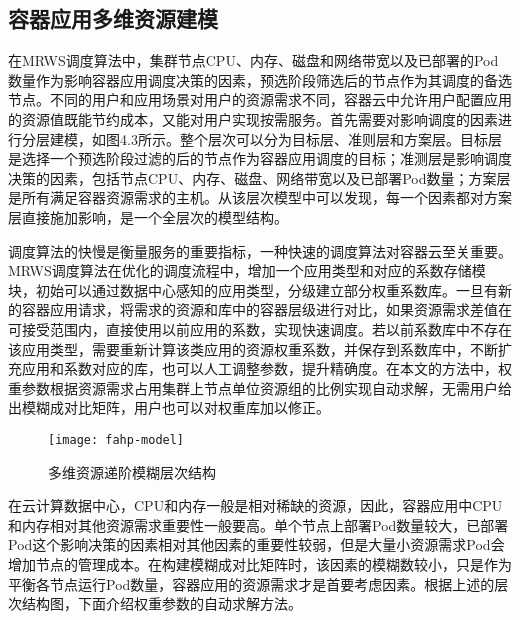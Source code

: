 \subsection{容器应用多维资源建模}
在MRWS调度算法中，集群节点CPU、内存、磁盘和网络带宽以及已部署的Pod数量作为影响容器应用调度决策的因素，预选阶段筛选后的节点作为其调度的备选节点。不同的用户和应用场景对用户的资源需求不同，容器云中允许用户配置应用的资源值既能节约成本，又能对用户实现按需服务。首先需要对影响调度的因素进行分层建模，如图4.3所示。整个层次可以分为目标层、准则层和方案层。目标层是选择一个预选阶段过滤的后的节点作为容器应用调度的目标；准测层是影响调度决策的因素，包括节点CPU、内存、磁盘、网络带宽以及已部署Pod数量；方案层是所有满足容器资源需求的主机。从该层次模型中可以发现，每一个因素都对方案层直接施加影响，是一个全层次的模型结构。

调度算法的快慢是衡量服务的重要指标，一种快速的调度算法对容器云至关重要。MRWS调度算法在优化的调度流程中，增加一个应用类型和对应的系数存储模块，初始可以通过数据中心感知的应用类型，分级建立部分权重系数库。一旦有新的容器应用请求，将需求的资源和库中的容器层级进行对比，如果资源需求差值在可接受范围内，直接使用以前应用的系数，实现快速调度。若以前系数库中不存在该应用类型，需要重新计算该类应用的资源权重系数，并保存到系数库中，不断扩充应用和系数对应的库，也可以人工调整参数，提升精确度。在本文的方法中，权重参数根据资源需求占用集群上节点单位资源组的比例实现自动求解，无需用户给出模糊成对比矩阵，用户也可以对权重库加以修正。
\begin{figure}[H] %
	\centering
	\texttt{[image: fahp-model]}
	\caption{多维资源递阶模糊层次结构}
\end{figure}
在云计算数据中心，CPU和内存一般是相对稀缺的资源，因此，容器应用中CPU和内存相对其他资源需求重要性一般要高。单个节点上部署Pod数量较大，已部署Pod这个影响决策的因素相对其他因素的重要性较弱，但是大量小资源需求Pod会增加节点的管理成本。在构建模糊成对比矩阵时，该因素的模糊数较小，只是作为平衡各节点运行Pod数量，容器应用的资源需求才是首要考虑因素。根据上述的层次结构图，下面介绍权重参数的自动求解方法。


